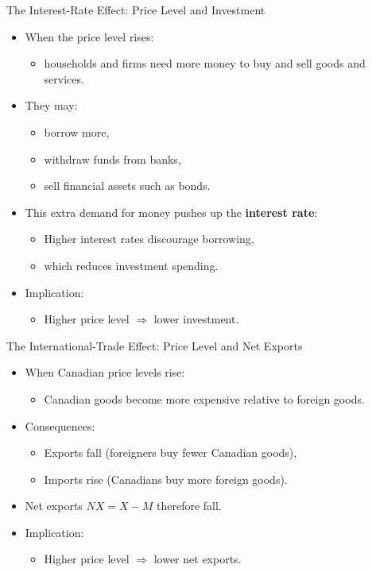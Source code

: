 \documentclass[aspectratio=169]{beamer}
\begin{document}
\begin{frame}{The Interest-Rate Effect: Price Level and Investment}
\transfade
\begin{itemize}[<+->]
  \item When the price level rises:
  \begin{itemize}[<+->]
    \item households and firms need more money to buy and sell goods and services.
  \end{itemize}
  \item They may:
  \begin{itemize}[<+->]
    \item borrow more,
    \item withdraw funds from banks,
    \item sell financial assets such as bonds.
  \end{itemize}
  \item This extra demand for money pushes up the \textbf{interest rate}:
  \begin{itemize}[<+->]
    \item Higher interest rates discourage borrowing,
    \item which reduces investment spending.
  \end{itemize}
  \item Implication:
  \begin{itemize}[<+->]
    \item \alert{Higher price level} \(\Rightarrow\) \alert{lower investment}.
  \end{itemize}
\end{itemize}
\end{frame}

\begin{frame}{The International-Trade Effect: Price Level and Net Exports}
\transfade
\begin{itemize}[<+->]
  \item When Canadian price levels rise:
  \begin{itemize}[<+->]
    \item Canadian goods become more expensive relative to foreign goods.
  \end{itemize}
  \item Consequences:
  \begin{itemize}[<+->]
    \item Exports fall (foreigners buy fewer Canadian goods),
    \item Imports rise (Canadians buy more foreign goods).
  \end{itemize}
  \item Net exports \(NX = X - M\) therefore fall.
  \item Implication:
  \begin{itemize}[<+->]
    \item \alert{Higher price level} \(\Rightarrow\) \alert{lower net exports}.
  \end{itemize}
\end{itemize}
\end{frame}
\end{document}
